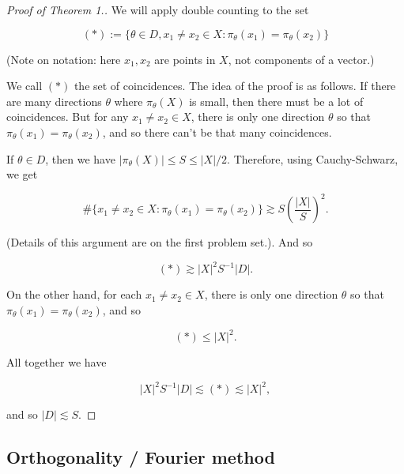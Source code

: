 \documentclass[12pt]{amsart}
\begin{document}
\begin{proof} [Proof of Theorem 1.]  We will apply double counting to the set

$$(*):= \{ \theta \in D, x_1 \not= x_2 \in X: \pi_\theta(x_1) = \pi_\theta(x_2) \}$$

(Note on notation: here $x_1, x_2$ are points in $X$, not components of a vector.)

We call $(*)$ the set of coincidences.  The idea of the proof is as follows.  If there are many directions $\theta$ where $\pi_\theta(X)$ is small, then there must be a lot of coincidences.  But for any $x_1 \not= x_2 \in X$, there is only one direction $\theta$ so that $\pi_\theta(x_1) =\pi_\theta(x_2)$, and so there can't be that many coincidences.

If $\theta \in D$, then we have $|\pi_\theta(X)| \le S \le |X|/2 $.  Therefore, using Cauchy-Schwarz, we get

$$ \# \{x_1 \not= x_2 \in X: \pi_\theta(x_1) = \pi_\theta(x_2) \} \gtrsim S \left( \frac{|X|}{S} \right)^2. $$

(Details of this argument are on the first problem set.). And so

$$ (*) \gtrsim |X|^2 S^{-1} |D|.$$

On the other hand, for each $x_1 \not= x_2 \in X$, there is only one direction $\theta$ so that $\pi_\theta(x_1) =\pi_\theta(x_2)$, and so

$$ (*) \le |X|^2.$$

All together we have

$$ |X|^2 S^{-1} |D| \lesssim (*) \lesssim |X|^2, $$

and so $|D| \lesssim S$.
\end{proof}

\subsection{Orthogonality / Fourier method}
\end{document}
